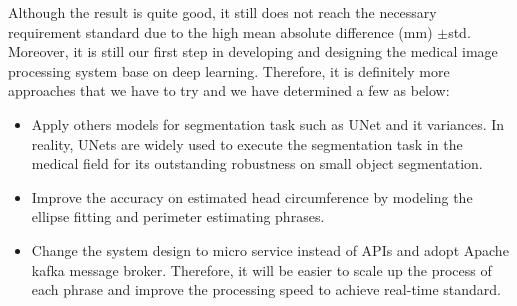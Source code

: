 	Although the result is quite good, it still does not reach the necessary requirement standard due to the high mean absolute difference (mm) $\pm$std. Moreover, it is still our first step in developing and designing the medical image processing system base on deep learning. Therefore, it is definitely more approaches that we have to try and we have determined a few as below:
	
	\begin{itemize}
		\item Apply others models for segmentation task such as UNet and it variances. In reality, UNets are widely used to execute the segmentation task in the medical field for its outstanding robustness on small object segmentation.
		
		\item Improve the accuracy on estimated head circumference by modeling the ellipse fitting and perimeter estimating phrases.
		
		\item Change the system design to micro service instead of APIs and adopt Apache kafka message broker. Therefore, it will be easier to scale up the process of each phrase and improve the processing speed to achieve real-time standard.
	\end{itemize}
	